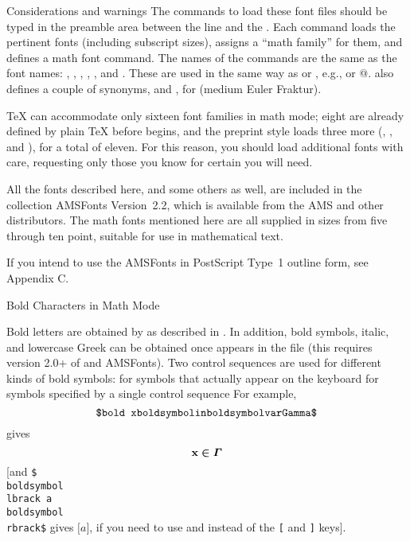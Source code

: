 \subsubhead Considerations and warnings\endsubsubhead
The commands to load these font files should be typed in the preamble area
between the
 line and the .
Each  command loads the pertinent fonts (including
subscript sizes), assigns a ``math
family'' for them, and defines a math font command.
The names of the commands are the same as the font names:
, , , , , and
.  These are used in the same way as
 or , e.g.,  or @.
\AmSTeX{} also defines a couple of synonyms,
 and , for  (medium Euler Fraktur).

\TeX{} can accommodate only sixteen font families in math mode; eight
are already defined by plain \TeX{} before \AmSTeX{} begins, and the
preprint style loads three more (, , and
), for a total of eleven.  For this reason, you should load
additional fonts with care, requesting only those you know for certain
you will need.

All the fonts described here, and some others as well, are included in the
collection AMSFonts Version~2.2, which is available from the AMS and other
distributors.  The math fonts mentioned here are all supplied in sizes from
five through ten point, suitable for use in mathematical text.

If you intend to use the AMSFonts in PostScript Type~1 outline form,
see Appendix C.


\subhead Bold Characters in Math Mode \endsubhead

Bold letters are obtained by  as described in \Joy{}.
In addition, bold symbols, italic, and lowercase Greek can be
obtained once  appears in the file (this
requires version 2.0+ of \AmSTeX{} and AMSFonts).  Two control sequences
are used for different kinds of bold symbols:
\beginexample{\exboxwidth=1.25in}
\exbox{}{\\boldkey} for symbols that actually appear on the keyboard
\exbox{}{\\boldsymbol} for symbols specified by a single control sequence
\endexample
\noindent
For example,
$$\hbox{\tt\$\\bold x \\boldsymbol\\in \\boldsymbol\\varGamma\$}$$
gives
$$\bold x \boldsymbol\in \boldsymbol\varGamma$$
[and {\tt\$\\boldsymbol\\lbrack a \\boldsymbol\\rbrack\$} gives
$\boldsymbol\lbrack a \boldsymbol\rbrack$, if you need to use
 and  instead of the {\tt[} and {\tt]} keys].

